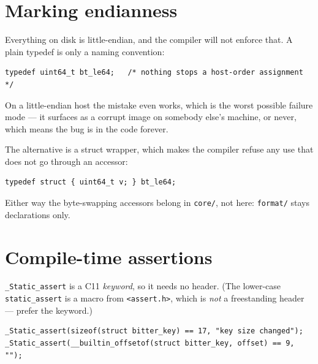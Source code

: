 \section{Marking endianness}
\label{sec:endianness-marking}

Everything on disk is little-endian, and the compiler will not enforce that. A
plain typedef is only a naming convention:

\begin{lstlisting}[style=c]
typedef uint64_t bt_le64;   /* nothing stops a host-order assignment */
\end{lstlisting}

On a little-endian host the mistake even works, which is the worst possible
failure mode --- it surfaces as a corrupt image on somebody else's machine, or
never, which means the bug is in the code forever.

The alternative is a struct wrapper, which makes the compiler refuse any use that
does not go through an accessor:

\begin{lstlisting}[style=c]
typedef struct { uint64_t v; } bt_le64;
\end{lstlisting}


Either way the byte-swapping accessors belong in \lstinline|core/|, not here:
\lstinline|format/| stays declarations only.

\section{Compile-time assertions}
\label{sec:static-assert}

\lstinline|_Static_assert| is a C11 \emph{keyword}, so it needs no header. (The
lower-case \lstinline|static_assert| is a macro from \lstinline|<assert.h>|, which
is \emph{not} a freestanding header --- prefer the keyword.)

\begin{lstlisting}[style=c]
_Static_assert(sizeof(struct bitter_key) == 17, "key size changed");
_Static_assert(__builtin_offsetof(struct bitter_key, offset) == 9, "");
\end{lstlisting}

